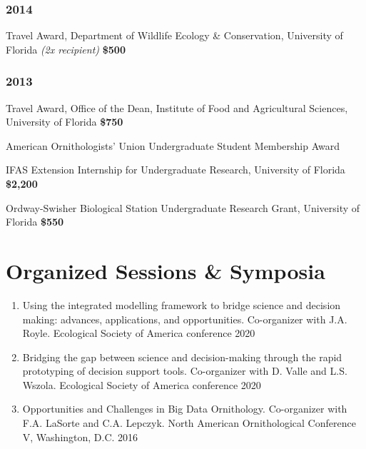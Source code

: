 \documentclass[11pt,]{article}
\providecommand{\tightlist}{%
  \setlength{\itemsep}{0pt}\setlength{\parskip}{0pt}}
\renewenvironment{itemize}{
 \begin{list}{- }{
   \setlength{\leftmargin}{1.5em}
   \setlength{\itemsep}{0pt}
 }
}{
 \end{list}
}
\begin{document}
\hypertarget{section-6}{%
\subsubsection{2014}\label{section-6}}

\begin{itemize}
\tightlist
\item
  Travel Award, Department of Wildlife Ecology \& Conservation,
  University of Florida \emph{(2x recipient)} \hfill \textbf{\$500}
\end{itemize}

\hypertarget{section-7}{%
\subsubsection{2013}\label{section-7}}

\begin{itemize}
\tightlist
\item
  Travel Award, Office of the Dean, Institute of Food and Agricultural
  Sciences, University of Florida \hfill \textbf{\$750}
\item
  American Ornithologists' Union Undergraduate Student Membership Award
  \hfill 
\item
  IFAS Extension Internship for Undergraduate Research, University of
  Florida \hfill  \textbf{\$2,200}
\item
  Ordway-Swisher Biological Station Undergraduate Research Grant,
  University of Florida \hfill  \textbf{\$550}
\end{itemize}

\hypertarget{organized-sessions-symposia}{%
\section{Organized Sessions \&
Symposia}\label{organized-sessions-symposia}}

\begin{enumerate}
\def\labelenumi{\arabic{enumi}.}
\tightlist
\item
  Using the integrated modelling framework to bridge science and
  decision making: advances, applications, and opportunities.
  Co-organizer with J.A. Royle. Ecological Society of America conference
  \hfill 2020
\item
  Bridging the gap between science and decision-making through the rapid
  prototyping of decision support tools. Co-organizer with D. Valle and
  L.S. Wszola. Ecological Society of America conference \hfill 2020
\item
  Opportunities and Challenges in Big Data Ornithology. Co-organizer
  with F.A. LaSorte and C.A. Lepczyk. North American Ornithological
  Conference V, Washington, D.C. \hfill 2016
\end{enumerate}
\end{document}
